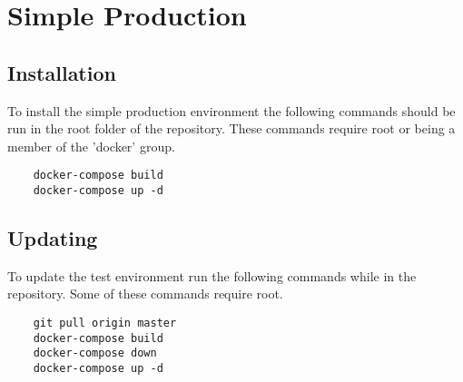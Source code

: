 \section{Simple Production}

\subsection{Installation}

To install the simple production environment the following commands should be run in the root folder of the repository.  These commands require root or being a member of the 'docker' group.

\begin{verbatim}
	docker-compose build
	docker-compose up -d
\end{verbatim}

\subsection{Updating}

To update the test environment run the following commands while in the repository.  Some of these commands require root.

\begin{verbatim}
	git pull origin master
	docker-compose build
	docker-compose down
	docker-compose up -d
\end{verbatim}

